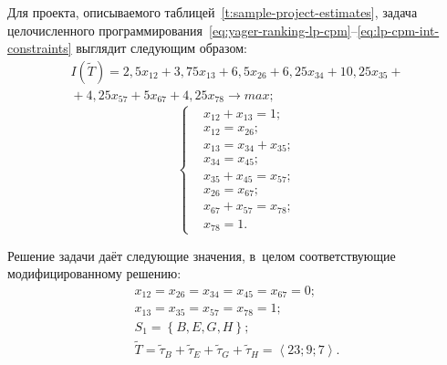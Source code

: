 Для проекта, описываемого таблицей~\ref{t:sample-project-estimates}, задача целочисленного программирования~\eqref{eq:yager-ranking-lp-cpm}--\eqref{eq:lp-cpm-int-constraints} выглядит следующим образом:
\begin{gather*}
  I\left( \tilde T \right) = 2,5x_{12}+3,75x_{13}+6,5x_{26}+6,25x_{34}+10,25x_{35}+{}\\
  {}+4,25x_{57}+5x_{67}+4,25x_{78} \to max;
\end{gather*}
\begin{equation*}
  \left \{ \begin{aligned}
    & x_{12} + x_{13} = 1; \\
    & x_{12} = x_{26}; \\
    & x_{13} = x_{34} + x_{35}; \\
    & x_{34} = x_{45}; \\
    & x_{35} + x_{45} = x_{57}; \\
    & x_{26} = x_{67}; \\
    & x_{67} + x_{57} = x_{78}; \\
    & x_{78} = 1.
  \end{aligned} \right.
\end{equation*}

Решение задачи даёт следующие значения, в~целом соответствующие модифицированному решению:
\begin{gather*}
  x_{12}=x_{26}=x_{34}=x_{45}=x_{67}=0; \\
  x_{13}=x_{35}=x_{57}=x_{78}=1; \\
  S_1=\left \{ B,E,G,H \right\}; \\
  \tilde T = \tilde \tau_B + \tilde \tau_E + \tilde \tau_G + \tilde \tau_H = \left \langle 23; 9; 7 \right \rangle.
\end{gather*}


